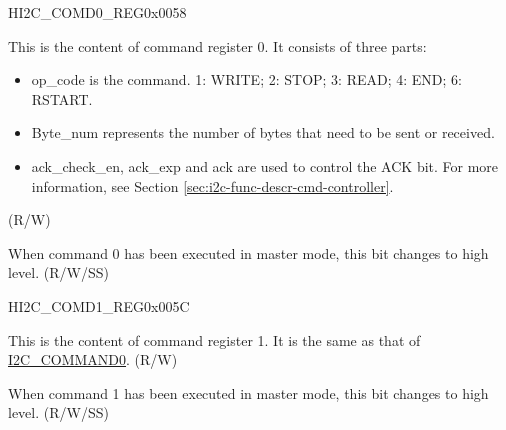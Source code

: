 \begin{register}{H}{I2C\_COMD0\_REG}{0x0058}\label{regdesc:I2CCOMD0REG}
%
%
%
\regnewline%
\begin{regdesc}\begin{reglist}
\label{fielddesc:I2CCOMMAND0}\item [I2C\_COMMAND0] This is the content of command register 0. It consists of three parts: 
\begin{itemize}
    \item op\_code is the command. 1: WRITE; 2: STOP; 3: READ; 4: END; 6: RSTART.
    \item Byte\_num represents the number of bytes that need to be sent or received.
    \item ack\_check\_en, ack\_exp and ack are used to control the ACK bit. For more information, see Section \ref{sec:i2c-func-descr-cmd-controller}.
\end{itemize} (R/W)
\label{fielddesc:I2CCOMMAND0DONE}\item [I2C\_COMMAND0\_DONE] When command 0 has been executed in master mode, this bit changes to high level. (R/W/SS)
\end{reglist}\end{regdesc}
\end{register}


\begin{register}{H}{I2C\_COMD1\_REG}{0x005C}\label{regdesc:I2CCOMD1REG}
%
%
%
\regnewline%
\begin{regdesc}\begin{reglist}
\label{fielddesc:I2CCOMMAND1}\item [I2C\_COMMAND1] This is the content of command register 1. It is the same as that of \hyperref[fielddesc:I2CCOMMAND0]{I2C\_COMMAND0}. (R/W)
\label{fielddesc:I2CCOMMAND1DONE}\item [I2C\_COMMAND1\_DONE] When command 1 has been executed in master mode, this bit changes to high
level. (R/W/SS)
\end{reglist}\end{regdesc}
\end{register}


